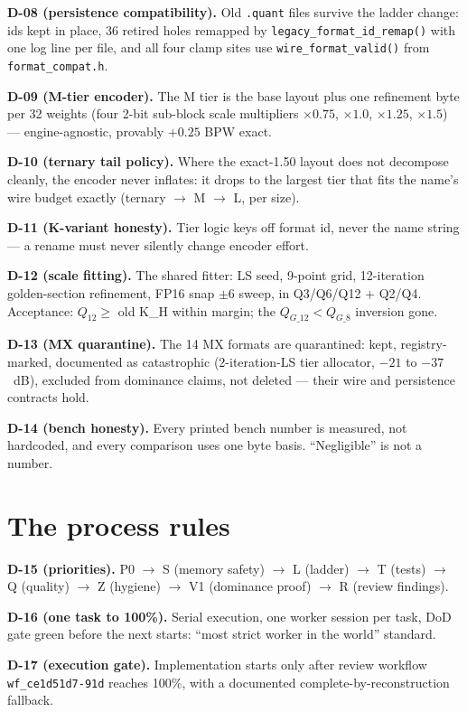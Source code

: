 \textbf{D-08 (persistence compatibility).} Old \texttt{.quant} files survive the ladder change:
ids kept in place, 36 retired holes remapped by \texttt{legacy\_format\_id\_remap()} with one
log line per file, and all four clamp sites use \texttt{wire\_format\_valid()} from
\texttt{format\_compat.h}.

\textbf{D-09 (M-tier encoder).} The M tier is the base layout plus one refinement byte per 32
weights (four 2-bit sub-block scale multipliers $\times0.75$, $\times1.0$, $\times1.25$,
$\times1.5$) --- engine-agnostic, provably $+0.25$ BPW exact.

\textbf{D-10 (ternary tail policy).} Where the exact-1.50 layout does not decompose cleanly,
the encoder never inflates: it drops to the largest tier that fits the name's wire budget
exactly (ternary $\to$ M $\to$ L, per size).

\textbf{D-11 (K-variant honesty).} Tier logic keys off format id, never the name string --- a
rename must never silently change encoder effort.

\textbf{D-12 (scale fitting).} The shared fitter: LS seed, 9-point grid, 12-iteration
golden-section refinement, FP16 snap $\pm6$ sweep, in Q3/Q6/Q12 + Q2/Q4. Acceptance:
$Q_{12}\ge$ old K\_H within margin; the $Q_{G\_12}<Q_{G\_8}$ inversion gone.

\textbf{D-13 (MX quarantine).} The 14 MX formats are quarantined: kept, registry-marked,
documented as catastrophic (2-iteration-LS tier allocator, $-21$ to $-37$~dB), excluded from
dominance claims, not deleted --- their wire and persistence contracts hold.

\textbf{D-14 (bench honesty).} Every printed bench number is measured, not hardcoded, and every
comparison uses one byte basis. ``Negligible'' is not a number.

\section{The process rules}

\textbf{D-15 (priorities).} P0 $\to$ S (memory safety) $\to$ L (ladder) $\to$ T (tests) $\to$
Q (quality) $\to$ Z (hygiene) $\to$ V1 (dominance proof) $\to$ R (review findings).

\textbf{D-16 (one task to 100\%).} Serial execution, one worker session per task, DoD gate
green before the next starts: ``most strict worker in the world'' standard.

\textbf{D-17 (execution gate).} Implementation starts only after review workflow
\texttt{wf\_ce1d51d7-91d} reaches 100\%, with a documented complete-by-reconstruction fallback.


